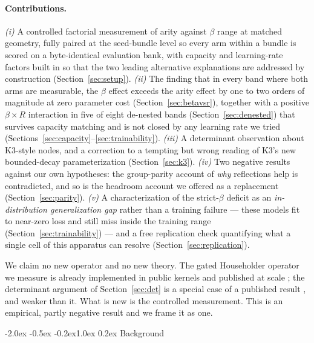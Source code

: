 \documentclass[10pt,twocolumn]{article}
\makeatletter
\renewcommand\section{\@startsection{section}{1}{\z@}%
  {-2.0ex \@plus -0.5ex \@minus -0.2ex}{1.0ex \@plus 0.2ex}%
  {\normalfont\large\bfseries}}
\makeatother
\begin{document}
\paragraph{Contributions.}
\emph{(i)} A controlled factorial measurement of arity against $\beta$ range at
matched geometry, fully paired at the seed-bundle level so every arm within a
bundle is scored on a byte-identical evaluation bank, with capacity and
learning-rate factors built in so that the two leading alternative explanations
are addressed by construction (Section~\ref{sec:setup}).
\emph{(ii)} The finding that in every band where both arms are measurable, the
$\beta$ effect exceeds the arity effect by one to two orders of magnitude at
zero parameter cost (Section~\ref{sec:betavsr}), together with a positive
$\beta\times R$ interaction in five of eight de-nested bands
(Section~\ref{sec:denested}) that survives capacity matching and is not closed
by any learning rate we tried
(Sections~\ref{sec:capacity}--\ref{sec:trainability}). \emph{(iii)} A
determinant observation about K3-style nodes, and a correction to a tempting but
wrong reading of K3's new bounded-decay parameterization
(Section~\ref{sec:k3}). \emph{(iv)} Two negative results against our own
hypotheses: the group-parity account of \emph{why} reflections help is
contradicted, and so is the headroom account we offered as a replacement
(Section~\ref{sec:parity}). \emph{(v)} A characterization of the strict-$\beta$
deficit as an \emph{in-distribution generalization gap} rather than a training
failure --- these models fit to near-zero loss and still miss inside the
training range (Section~\ref{sec:trainability}) --- and a free replication
check quantifying what a single cell of this apparatus can resolve
(Section~\ref{sec:replication}).

We claim no new operator and no new theory. The gated Householder operator we
measure is already implemented in public kernels and published at scale
\cite{li2026eda}; the determinant argument of Section~\ref{sec:det} is a special
case of a published result \cite{grazzi2024negative}, and weaker than it. What is
new is the controlled measurement. This is an empirical, partly negative result
and we frame it as one.

\section{Background}
\label{sec:background}
\end{document}
